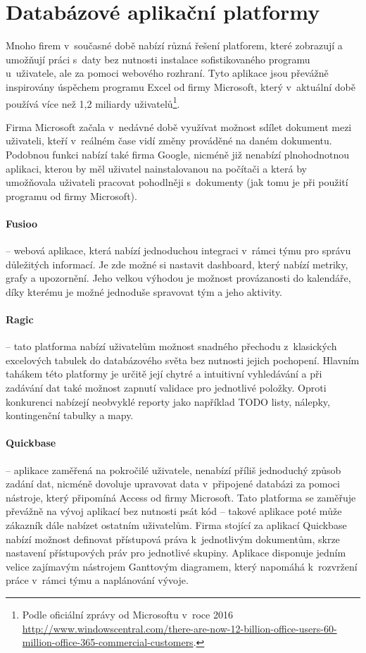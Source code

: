 \section{Databázové aplikační platformy}
\par Mnoho firem v~současné době nabízí různá řešení platforem, které zobrazují a umožňují práci s~daty bez nutnosti instalace sofistikovaného programu u~uživatele, ale za pomoci webového rozhraní. Tyto aplikace jsou převážně inspirovány úspěchem programu Excel od firmy Microsoft, který v~aktuální době používá více než 1,2 miliardy uživatelů\footnote{Podle oficiální zprávy od Microsoftu v~roce 2016 \url{http://www.windowscentral.com/there-are-now-12-billion-office-users-60-million-office-365-commercial-customers}.}.

\par Firma Microsoft začala v~nedávné době využívat možnost sdílet dokument mezi uživateli, kteří v~reálném čase vidí změny prováděné na daném dokumentu. Podobnou funkci nabízí také firma Google, nicméně již nenabízí plnohodnotnou aplikaci, kterou by měl uživatel nainstalovanou na počítači a která by umožňovala uživateli pracovat pohodlněji s~dokumenty (jak tomu je při použití programu od firmy Microsoft).

\paragraph{Fusioo} -- webová aplikace, která nabízí jednoduchou integraci v~rámci týmu pro správu důležitých informací. Je zde možné si nastavit dashboard, který nabízí metriky, grafy a upozornění. Jeho velkou výhodou je možnost provázanosti do kalendáře, díky kterému je možné jednoduše spravovat tým a jeho aktivity.

\paragraph{Ragic} -- tato platforma nabízí uživatelům možnost snadného přechodu z~klasických excelových tabulek do databázového světa bez nutnosti jejich pochopení. Hlavním tahákem této platformy je určitě její chytré a intuitivní vyhledávání a při zadávání dat také možnost zapnutí validace pro jednotlivé položky. Oproti konkurenci nabízejí neobvyklé reporty jako například TODO listy, nálepky, kontingenční tabulky a mapy.

\paragraph{Quickbase} -- aplikace zaměřená na pokročilé uživatele, nenabízí příliš jednoduchý způsob zadání dat, nicméně dovoluje upravovat data v~připojené databázi za pomoci nástroje, který připomíná Access od firmy Microsoft. Tato platforma se zaměřuje převážně na vývoj aplikací bez nutnosti psát kód -- takové aplikace poté může zákazník dále nabízet ostatním uživatelům. Firma stojící za aplikací Quickbase nabízí možnost definovat přístupová práva k~jednotlivým dokumentům, skrze nastavení přístupových práv pro jednotlivé skupiny. Aplikace disponuje jedním velice zajímavým nástrojem Ganttovým diagramem, který napomáhá k~rozvržení práce v~rámci týmu a naplánování vývoje.

